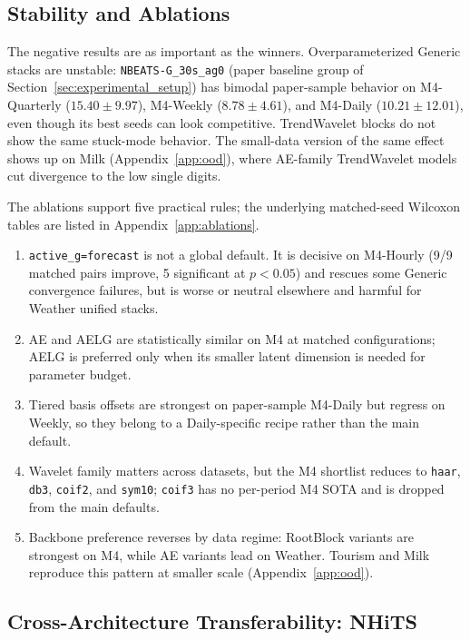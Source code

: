 \documentclass[11pt,a4paper]{article}
\begin{document}
\subsection{Stability and Ablations}
\label{sec:depth_stability}

The negative results are as important as the winners. Overparameterized Generic stacks are unstable: \texttt{NBEATS-G\_30s\_ag0} (paper baseline group of Section~\ref{sec:experimental_setup}) has bimodal paper-sample behavior on M4-Quarterly ($15.40 \pm 9.97$), M4-Weekly ($8.78 \pm 4.61$), and M4-Daily ($10.21 \pm 12.01$), even though its best seeds can look competitive. TrendWavelet blocks do not show the same stuck-mode behavior. The small-data version of the same effect shows up on Milk (Appendix~\ref{app:ood}), where AE-family TrendWavelet models cut divergence to the low single digits.

The ablations support five practical rules; the underlying matched-seed Wilcoxon tables are listed in Appendix~\ref{app:ablations}.
\begin{enumerate}
\item \texttt{active\_g=forecast} is not a global default. It is decisive on M4-Hourly (9/9 matched pairs improve, 5 significant at $p<0.05$) and rescues some Generic convergence failures, but is worse or neutral elsewhere and harmful for Weather unified stacks.
\item AE and AELG are statistically similar on M4 at matched configurations; AELG is preferred only when its smaller latent dimension is needed for parameter budget.
\item Tiered basis offsets are strongest on paper-sample M4-Daily but regress on Weekly, so they belong to a Daily-specific recipe rather than the main default.
\item Wavelet family matters across datasets, but the M4 shortlist reduces to \texttt{haar}, \texttt{db3}, \texttt{coif2}, and \texttt{sym10}; \texttt{coif3} has no per-period M4 SOTA and is dropped from the main defaults.
\item Backbone preference reverses by data regime: RootBlock variants are strongest on M4, while AE variants lead on Weather. Tourism and Milk reproduce this pattern at smaller scale (Appendix~\ref{app:ood}).
\end{enumerate}

\subsection{Cross-Architecture Transferability: NHiTS}
\label{sec:transfer_summary}
\end{document}
